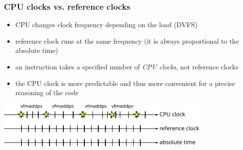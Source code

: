 \documentclass[12pt,dvipdfmx]{beamer}
\begin{document}
\begin{frame}[fragile]
  \frametitle{CPU clocks vs. reference clocks}
  \begin{itemize}
  \item CPU changes clock frequency depending on the load (DVFS)
  \item reference clock runs at the same frequency (it is
    always proportional to the absolute time)
  \item an instruction takes a specified number of
    {\it CPU clocks}, not reference clocks
  \item the CPU clock is more predictable and thus
    more convenient for a precise reasoning of the code
  \end{itemize}

  \begin{center}
\begin{center}
\includegraphics[width=0.8\textwidth]{out/pdf/svg/latency_2.pdf}
\end{center}
  \end{center}
\end{frame}

\end{document}
